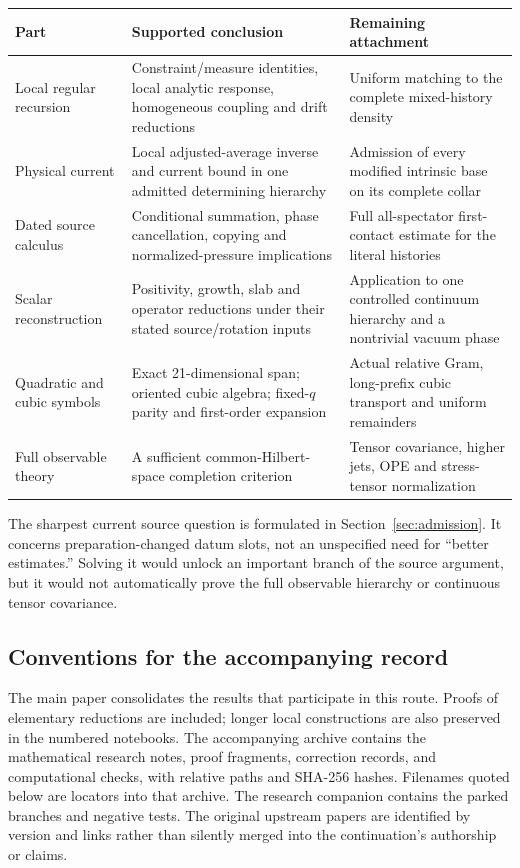 \begin{longtable}{@{}>{\raggedright\arraybackslash}p{.23\linewidth}>{\raggedright\arraybackslash}p{.40\linewidth}>{\raggedright\arraybackslash}p{.29\linewidth}@{}}
\toprule
Part & Supported conclusion & Remaining attachment \\
\midrule\endhead
Local regular recursion & Constraint/measure identities, local analytic
response, homogeneous coupling and drift reductions & Uniform matching
to the complete mixed-history density \\
Physical current & Local adjusted-average inverse and current bound in
one admitted determining hierarchy & Admission of every modified
intrinsic base on its complete collar \\
Dated source calculus & Conditional summation, phase cancellation,
copying and normalized-pressure implications & Full all-spectator
first-contact estimate for the literal histories \\
Scalar reconstruction & Positivity, growth, slab and operator reductions
under their stated source/rotation inputs & Application to one controlled
continuum hierarchy and a nontrivial vacuum phase \\
Quadratic and cubic symbols & Exact 21-dimensional span; oriented cubic
algebra; fixed-\(q\) parity and first-order expansion & Actual relative
Gram, long-prefix cubic transport and uniform remainders \\
Full observable theory & A sufficient common-Hilbert-space completion
criterion & Tensor covariance, higher jets, OPE and stress-tensor
normalization \\
\bottomrule
\end{longtable}

The sharpest current source question is formulated in
Section~\ref{sec:admission}. It concerns preparation-changed datum slots,
not an unspecified need for ``better estimates.'' Solving it would unlock
an important branch of the source argument, but it would not automatically
prove the full observable hierarchy or continuous tensor covariance.

\subsection{Conventions for the accompanying record}

The main paper consolidates the results that participate in this route.
Proofs of elementary reductions are included; longer local constructions
are also preserved in the numbered notebooks. The accompanying archive
contains the mathematical research notes, proof fragments, correction
records, and computational checks, with relative paths and SHA-256
hashes. Filenames quoted below are locators into that archive. The
research companion contains the parked branches and negative tests.
The original upstream papers are identified by version and links rather
than silently merged into the continuation's authorship or claims.
